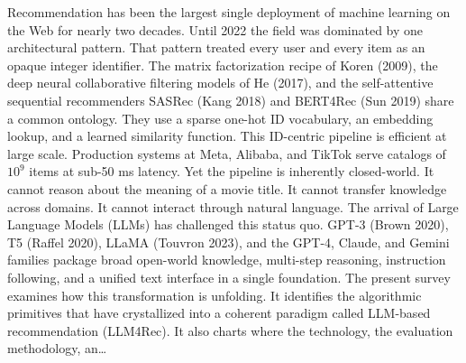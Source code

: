 Recommendation has been the largest single deployment of machine learning on the Web for nearly two decades. Until 2022 the field was dominated by one architectural pattern. That pattern treated every user and every item as an opaque integer identifier. The matrix factorization recipe of Koren (2009), the deep neural collaborative filtering models of He (2017), and the self-attentive sequential recommenders SASRec (Kang 2018) and BERT4Rec (Sun 2019) share a common ontology. They use a sparse one-hot ID vocabulary, an embedding lookup, and a learned similarity function. This ID-centric pipeline is efficient at large scale. Production systems at Meta, Alibaba, and TikTok serve catalogs of \(10^9\) items at sub-50 ms latency. Yet the pipeline is inherently closed-world. It cannot reason about the meaning of a movie title. It cannot transfer knowledge across domains. It cannot interact through natural language. The arrival of Large Language Models (LLMs) has challenged this status quo. GPT-3 (Brown 2020), T5 (Raffel 2020), LLaMA (Touvron 2023), and the GPT-4, Claude, and Gemini families package broad open-world knowledge, multi-step reasoning, instruction following, and a unified text interface in a single foundation. The present survey examines how this transformation is unfolding. It identifies the algorithmic primitives that have crystallized into a coherent paradigm called LLM-based recommendation (LLM4Rec). It also charts where the technology, the evaluation methodology, an\ldots{}
